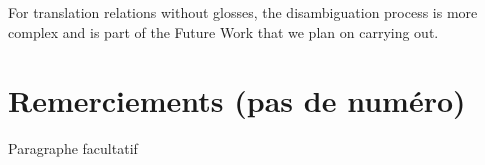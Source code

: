 \documentclass[10pt,a4paper,twoside]{article}
\begin{document}
For translation relations without glosses, the disambiguation process is more complex and is part of the Future Work that we plan on carrying out.


\section*{Remerciements (pas de numéro)}

Paragraphe facultatif




\end{document}
